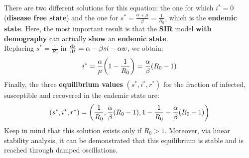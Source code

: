 \documentclass[../main/main.tex]{subfiles}
\begin{document}
There are two different solutions for this equation: the one for which \( i^* = 0 \) (\textbf{disease free state}) and the one for \( s^* = \frac{\alpha + \mu }{\beta } = \frac{1}{R_0} \), which is the \textbf{endemic state}. Here, the most important result is that the \textbf{SIR} model \textbf{with demography} can actually \textbf{show} an \textbf{endemic state}.\\

Replacing \( s^* = \frac{1}{R_0} \) in \( \dv{s}{t} = \alpha - \beta s i - \alpha w  \), we obtain:
\begin{equation*}
  i^* = \frac{\alpha }{\mu } \qty(1 - \frac{1}{R_0}) = \frac{\alpha }{\beta } (R_0 -1)
\end{equation*}
Finally, the three \textbf{equilibrium values} $(s^*, i^*, r^*)$ for the fraction of infected, susceptible and recovered in the endemic state are:
\begin{equation}
  (s^*, i^*, r^*) = \qty( \frac{1}{R_0}, \frac{\alpha }{\beta } (R_0 -1 ), 1- \frac{1}{R_0} - \frac{\alpha }{\beta } (R_0-1))
\end{equation}
Keep in mind that this solution exists only if \( R_0>1 \). Moreover, via linear stability analysis, it can be demonstrated that this equilibrium is stable and is reached through damped oscillations.
\end{document}
